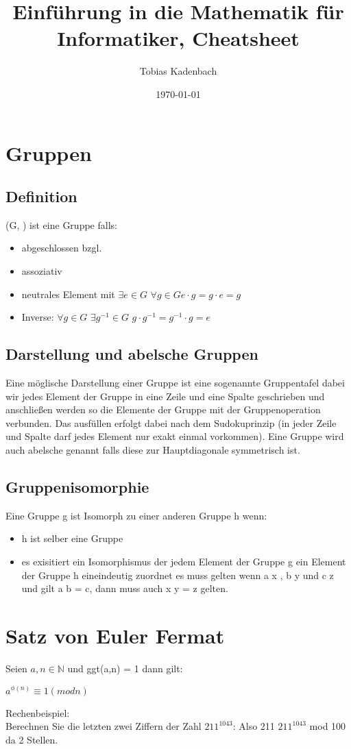 \documentclass[12pt, letterpaper, twoside]{article}
\title{Einführung in die Mathematik für Informatiker, Cheatsheet}
\author{Tobias Kadenbach}
\date{\today}
\begin{document}
\maketitle

\tableofcontents 

\section{Gruppen}
\subsection{Definition}
(G, \cdot) ist eine Gruppe falls:
\begin{itemize}
	\item abgeschlossen bzgl. \cdot
	\item assoziativ
	\item neutrales Element mit $ \exists e \in G $ $\forall g \in G e \cdot g = g \cdot e = g $
	\item Inverse: $ \forall g \in G $  $\exists g^{-1}  \in G $ $g \cdot g^{-1} = g^{-1} \cdot g = e $
\end{itemize}
\subsection{Darstellung und abelsche Gruppen}
\noindent
Eine möglische Darstellung einer Gruppe ist eine sogenannte Gruppentafel dabei wir jedes Element der Gruppe in eine Zeile und eine Spalte geschrieben und anschließen werden so die Elemente der Gruppe mit der Gruppenoperation verbunden. Das ausfüllen erfolgt dabei nach dem Sudokuprinzip (in jeder Zeile und Spalte darf jedes Element nur exakt einmal vorkommen).  
Eine Gruppe wird auch abelsche genannt falls diese zur Hauptdiagonale symmetrisch ist. \\

\subsection{Gruppenisomorphie}
\noindent
Eine Gruppe g ist Isomorph zu einer anderen Gruppe h wenn:
\begin{itemize}
	\item h ist selber eine Gruppe
	\item es exisitiert ein Isomorphismus der jedem Element der Gruppe g ein Element der Gruppe h eineindeutig zuordnet es muss gelten wenn a \mapsto x , b \mapsto y und c \mapsto z und gilt a \cdot b = c, dann muss auch x \cdot y = z gelten.
\end{itemize}






\section{Satz von Euler Fermat}
Seien $ a,n \in  \mathbb{N} $ und ggt(a,n) = 1 dann gilt: \\
\begin{center}
$ a^{\phi (n)} \equiv 1 (mod n) $ \\
\end{center}
Rechenbeispiel: \\
Berechnen Sie die letzten zwei Ziffern der Zahl $ 211^{1043} $:
Also 211 $ 211^{1043} $ mod 100 da 2 Stellen.
\end{document}
